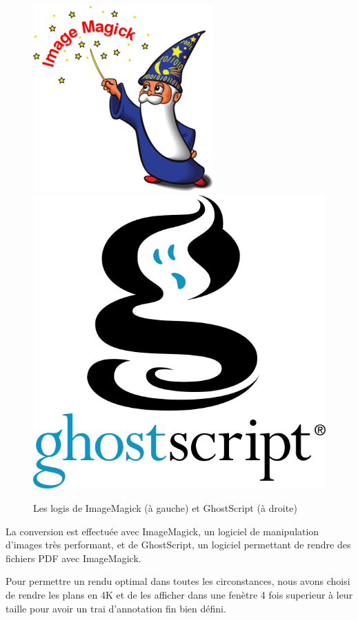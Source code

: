 \begin{figure}[h]
    \centering
    \includegraphics[scale=0.3]{img/image-magick.png}
    \hspace{5cm}
    \includegraphics[scale=0.13]{img/ghostscript.png}
    \caption{Les logis de ImageMagick (à gauche) et GhostScript (à droite)}
\end{figure}

La conversion est effectuée avec ImageMagick, un logiciel de manipulation d'images très performant, et de GhostScript, un logiciel permettant de rendre des fichiers PDF avec ImageMagick.

Pour permettre un rendu optimal dans toutes les circonstances, nous avons choisi de rendre les plans en 4K et de les afficher dans une fenètre 4 fois superieur à leur taille pour avoir un trai d'annotation fin bien défini.

